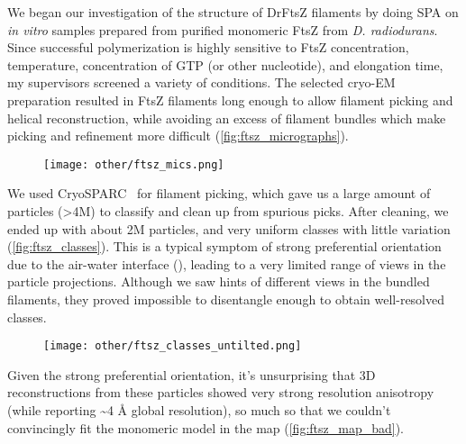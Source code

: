 We began our investigation of the structure of DrFtsZ filaments by doing SPA on \textit{in vitro} samples prepared from purified monomeric FtsZ from \textit{D. radiodurans}.
Since successful polymerization is highly sensitive to FtsZ concentration, temperature, concentration of GTP (or other nucleotide), and elongation time, my supervisors screened a variety of conditions.
The selected cryo-EM preparation resulted in FtsZ filaments long enough to allow filament picking and helical reconstruction, while avoiding an excess of filament bundles which make picking and refinement more difficult (\autoref{fig:ftsz_micrographs}).

\begin{figure}[ht]
    \centering
    \texttt{[image: other/ftsz\_mics.png]}
    \label{fig:ftsz_micrographs}
\end{figure}

We used CryoSPARC~\cite{punjaniCryoSPARCAlgorithmsRapid2017} for filament picking, which gave us a large amount of particles (>4M) to classify and clean up from spurious picks.
After cleaning, we ended up with about 2M particles, and very uniform classes with little variation (\autoref{fig:ftsz_classes}).
This is a typical symptom of strong preferential orientation due to the air-water interface (), leading to a very limited range of views in the particle projections.
Although we saw hints of different views in the bundled filaments, they proved impossible to disentangle enough to obtain well-resolved classes.

\begin{figure}[ht]
    \centering
    \texttt{[image: other/ftsz\_classes\_untilted.png]}
    \label{fig:ftsz_classes}
\end{figure}

Given the strong preferential orientation, it's unsurprising that 3D reconstructions from these particles showed very strong resolution anisotropy (while reporting \sim4 Å global resolution), so much so that we couldn't convincingly fit the monomeric model in the map (\autoref{fig:ftsz_map_bad}).

